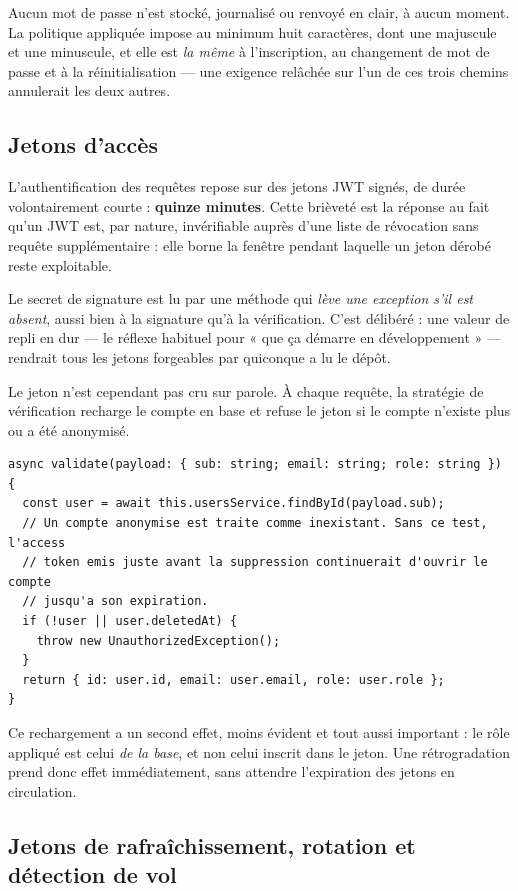 Aucun mot de passe n'est stocké, journalisé ou renvoyé en clair, à aucun
moment. La politique appliquée impose au minimum huit caractères, dont une
majuscule et une minuscule, et elle est \emph{la même} à l'inscription, au
changement de mot de passe et à la réinitialisation --- une exigence relâchée
sur l'un de ces trois chemins annulerait les deux autres.

\subsection{Jetons d'accès}

L'authentification des requêtes repose sur des jetons JWT signés, de durée
volontairement courte : \textbf{quinze minutes}. Cette brièveté est la réponse
au fait qu'un JWT est, par nature, invérifiable auprès d'une liste de
révocation sans requête supplémentaire : elle borne la fenêtre pendant laquelle
un jeton dérobé reste exploitable.

Le secret de signature est lu par une méthode qui \emph{lève une exception s'il
est absent}, aussi bien à la signature qu'à la vérification. C'est délibéré :
une valeur de repli en dur --- le réflexe habituel pour « que ça démarre en
développement » --- rendrait tous les jetons forgeables par quiconque a lu le
dépôt.

Le jeton n'est cependant pas cru sur parole. À chaque requête, la stratégie de
vérification recharge le compte en base et refuse le jeton si le compte
n'existe plus ou a été anonymisé.

\begin{lstlisting}[caption={Vérification du jeton d'accès : la signature ne suffit pas},captionpos=b]
async validate(payload: { sub: string; email: string; role: string }) {
  const user = await this.usersService.findById(payload.sub);
  // Un compte anonymise est traite comme inexistant. Sans ce test, l'access
  // token emis juste avant la suppression continuerait d'ouvrir le compte
  // jusqu'a son expiration.
  if (!user || user.deletedAt) {
    throw new UnauthorizedException();
  }
  return { id: user.id, email: user.email, role: user.role };
}
\end{lstlisting}

Ce rechargement a un second effet, moins évident et tout aussi important : le
rôle appliqué est celui \emph{de la base}, et non celui inscrit dans le jeton.
Une rétrogradation prend donc effet immédiatement, sans attendre l'expiration
des jetons en circulation.

\subsection{Jetons de rafraîchissement, rotation et détection de vol}

